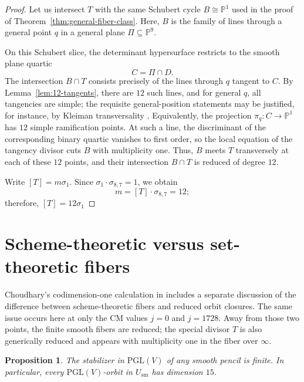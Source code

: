 \documentclass[11pt]{article}
\newtheorem{proposition}[theorem]{Proposition}
\newcommand{\Pj}{\mathbb P}
\newcommand{\PGL}{\mathrm{PGL}}
\begin{document}
\begin{proof}
Let us intersect $T$ with the same Schubert cycle $B\cong \Pj^1$ used in the proof of Theorem~\ref{thm:general-fiber-class}. Here, $B$ is the family of lines through a general point $q$ in a general plane $\Pi\subseteq \Pj^9$.

On this Schubert slice, the determinant hypersurface restricts to the smooth plane quartic
\[
C=\Pi\cap D.
\]
The intersection $B\cap T$ consists precisely of the lines through $q$ tangent to $C$. By Lemma~\ref{lem:12-tangents}, there are $12$ such lines, and for general $q$, all tangencies are simple; the requisite general-position statements may be justified, for instance, by Kleiman transversality \cite{Kleiman}. Equivalently, the projection $\pi_q\colon C\to \Pj^1$ has $12$ simple ramification points. At such a line, the discriminant of the corresponding binary quartic vanishes to first order, so the local equation of the tangency divisor cuts $B$ with multiplicity one. Thus, $B$ meets $T$ transversely at each of these $12$ points, and their intersection $B\cap T$ is reduced of degree $12$.

Write $[T]=m\sigma_1$. Since $\sigma_1\cdot \sigma_{8,7}=1$, we obtain
\[
m=[T]\cdot \sigma_{8,7}=12;
\]
therefore, $[T]=12\sigma_1$
\end{proof}

\section{Scheme-theoretic versus set-theoretic fibers}

Choudhary's codimension-one calculation in \cite{Choudhary} includes a separate discussion of the difference between scheme-theoretic fibers and reduced orbit closures. The same issue occurs here at only the CM values $j=0$ and $j=1728$. Away from those two points, the finite smooth fibers
are reduced; the special divisor $T$ is also generically reduced and appears with multiplicity one
in the fiber over $\infty$.

\begin{proposition}\label{prop:finite-stabilizer-smooth}
The stabilizer in $\PGL(V)$ of any smooth pencil is finite. In particular, every
$\PGL(V)$-orbit in $U_{\mathrm{sm}}$ has dimension $15$.
\end{proposition}
\end{document}
